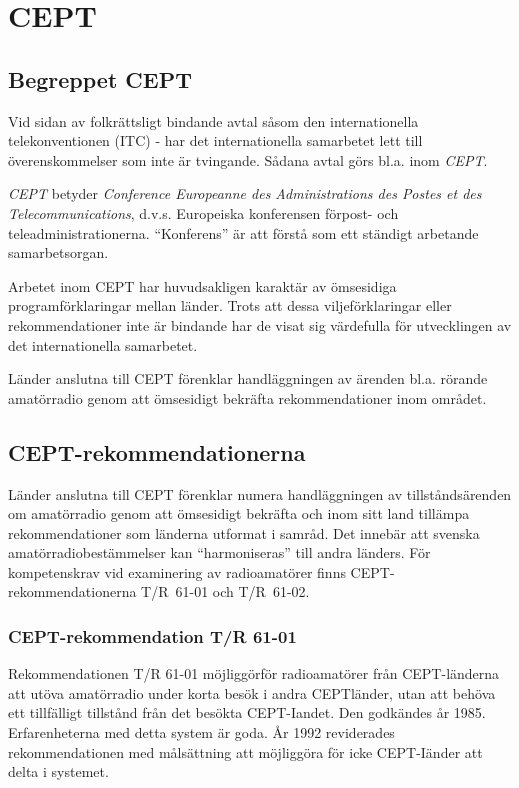 \section{CEPT}

\subsection{Begreppet CEPT}

Vid sidan av folkrättsligt bindande avtal såsom den internationella
telekonventionen (ITC) - har det internationella samarbetet lett till
överenskommelser som inte är tvingande. Sådana avtal görs bl.a. inom
\emph{CEPT}.

\emph{CEPT} betyder \emph{Conference Europeanne des Administrations
  des Postes et des Telecommunications}, d.v.s. Europeiska konferensen
förpost- och teleadministrationerna. ``Konferens'' är att förstå som
ett ständigt arbetande samarbetsorgan.

Arbetet inom CEPT har huvudsakligen karaktär av ömsesidiga
programförklaringar mellan länder. Trots att dessa viljeförklaringar
eller rekommendationer inte är bindande har de visat sig värdefulla
för utvecklingen av det internationella samarbetet.

Länder anslutna till CEPT förenklar handläggningen av ärenden
bl.a. rörande amatörradio genom att ömsesidigt bekräfta
rekommendationer inom området.

\subsection{CEPT-rekommendationerna}

Länder anslutna till CEPT förenklar numera handläggningen av
tillståndsärenden om amatörradio genom att ömsesidigt bekräfta och
inom sitt land tillämpa rekommendationer som länderna utformat i
samråd. Det innebär att svenska amatörradiobestämmelser kan
``harmoniseras'' till andra länders.  För kompetenskrav vid
examinering av radioamatörer finns CEPT-rekommendationerna T/R~61-01
och T/R~61-02.

\subsubsection{CEPT-rekommendation T/R 61-01}

Rekommendationen T/R 61-01 möjliggörför radioamatörer från
CEPT-länderna att utöva amatörradio under korta besök i andra
CEPTländer, utan att behöva ett tillfälligt tillstånd från det besökta
CEPT-Iandet. Den godkändes år 1985. Erfarenheterna med detta system är
goda. År 1992 reviderades rekommendationen med målsättning att
möjliggöra för icke CEPT-Iänder att delta i systemet.

